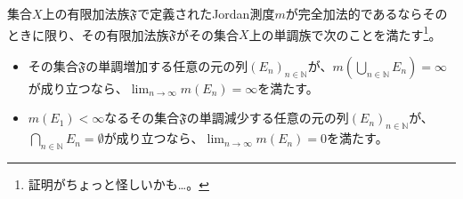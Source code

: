 \documentclass[dvipdfmx]{jsarticle}
\begin{document}
\begin{thm}\label{4.5.6.2}
集合$X$上の有限加法族$\mathfrak{F}$で定義されたJordan測度$m$が完全加法的であるならそのときに限り、その有限加法族$\mathfrak{F}$がその集合$X$上の単調族で次のことを満たす\footnote{証明がちょっと怪しいかも…。}。
\begin{itemize}
\item
  その集合$\mathfrak{F}$の単調増加する任意の元の列$\left( E_{n} \right)_{n \in \mathbb{N}}$が、$m\left( \bigcup_{n \in \mathbb{N}} E_{n} \right) = \infty$が成り立つなら、$\lim_{n \rightarrow \infty}{m\left( E_{n} \right)} = \infty$を満たす。
\item
  $m\left( E_{1} \right) < \infty$なるその集合$\mathfrak{F}$の単調減少する任意の元の列$\left( E_{n} \right)_{n \in \mathbb{N}}$が、$\bigcap_{n \in \mathbb{N}} E_{n} = \emptyset$が成り立つなら、$\lim_{n \rightarrow \infty}{m\left( E_{n} \right)} = 0$を満たす。
\end{itemize}
\end{thm}
\end{document}
